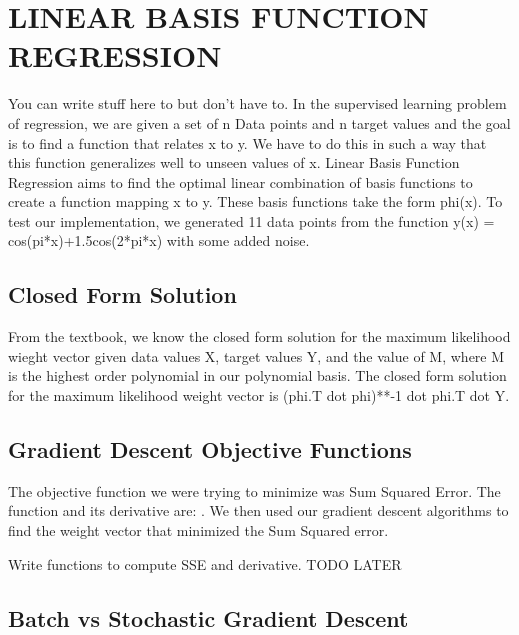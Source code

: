 \documentclass[a4paper,twoside]{article}
\begin{document}
\section{\uppercase{Linear Basis Function Regression}}

You can write stuff here to but don't have to. In the supervised learning problem of regression, we are given a set of n Data points and n target values and the goal is to find a function that relates x to y. We have to do this in such a way that this function generalizes well to unseen values of x. Linear Basis Function Regression aims to find the optimal linear combination of basis functions to create a function mapping x to y. These basis functions take the form phi(x). To test our implementation, we generated 11 data points from the function y(x) = cos(pi*x)+1.5cos(2*pi*x) with some added noise. 

\subsection{Closed Form Solution}

From the textbook, we know the closed form solution for the maximum likelihood wieght vector given data values X, target values Y, and the value of M, where M is the highest order polynomial in our polynomial basis. The closed form solution for the maximum likelihood weight vector is (phi.T dot phi)**-1 dot phi.T dot Y. 

\subsection{Gradient Descent Objective Functions}

The objective function we were trying to minimize was Sum Squared Error. The function and its derivative are: . We then used our gradient descent algorithms to find the weight vector that minimized the Sum Squared error. 

Write functions to compute SSE and derivative. TODO LATER

\subsection{Batch vs Stochastic Gradient Descent}
\end{document}
